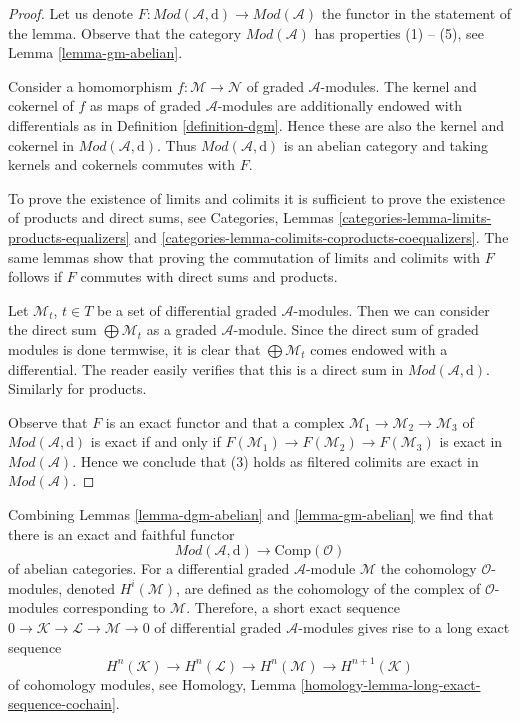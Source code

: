 \documentclass{stacks-project}
\theoremstyle{plain}
\theoremstyle{definition}
\theoremstyle{remark}
\numberwithin{equation}{subsection}
\begin{document}
\begin{proof}
Let us denote
$F : \textit{Mod}(\mathcal{A}, \text{d}) \to \textit{Mod}(\mathcal{A})$
the functor in the statement of the lemma. Observe that
the category $\textit{Mod}(\mathcal{A})$ has properties (1) -- (5), see
Lemma \ref{lemma-gm-abelian}.

\medskip\noindent
Consider a homomorphism $f : \mathcal{M} \to \mathcal{N}$
of graded $\mathcal{A}$-modules. The kernel
and cokernel of $f$ as maps of graded $\mathcal{A}$-modules
are additionally endowed with differentials as in
Definition \ref{definition-dgm}. Hence these are also
the kernel and cokernel in $\textit{Mod}(\mathcal{A}, \text{d})$.
Thus $\textit{Mod}(\mathcal{A}, \text{d})$ is an abelian category
and taking kernels and cokernels commutes with $F$.

\medskip\noindent
To prove the existence of limits and colimits it is sufficient
to prove the existence of products and direct sums, see
Categories, Lemmas \ref{categories-lemma-limits-products-equalizers} and
\ref{categories-lemma-colimits-coproducts-coequalizers}.
The same lemmas show that
proving the commutation of limits and colimits with $F$
follows if $F$ commutes with direct sums and products.

\medskip\noindent
Let $\mathcal{M}_t$, $t \in T$ be a set of differential
graded $\mathcal{A}$-modules. Then we can consider the direct
sum $\bigoplus \mathcal{M}_t$ as a graded $\mathcal{A}$-module.
Since the direct sum of graded modules is done termwise, it is
clear that $\bigoplus \mathcal{M}_t$ comes endowed with a differential.
The reader easily verifies that this is a direct sum in
$\textit{Mod}(\mathcal{A}, \text{d})$. Similarly for products.

\medskip\noindent
Observe that $F$ is an exact functor and that
a complex $\mathcal{M}_1 \to \mathcal{M}_2 \to \mathcal{M}_3$
of $\textit{Mod}(\mathcal{A}, \text{d})$ is exact if and only if
$F(\mathcal{M}_1) \to F(\mathcal{M}_2) \to F(\mathcal{M}_3)$
is exact in $\textit{Mod}(\mathcal{A})$. Hence we conclude that (3)
holds as filtered colimits are exact in
$\textit{Mod}(\mathcal{A})$.
\end{proof}

\noindent
Combining Lemmas \ref{lemma-dgm-abelian} and \ref{lemma-gm-abelian}
we find that there is an exact and faithful functor
$$
\textit{Mod}(\mathcal{A}, \text{d}) \longrightarrow \text{Comp}(\mathcal{O})
$$
of abelian categories. For a differential graded $\mathcal{A}$-module
$\mathcal{M}$ the cohomology $\mathcal{O}$-modules, denoted $H^i(\mathcal{M})$,
are defined as the cohomology of the complex of
$\mathcal{O}$-modules corresponding to $\mathcal{M}$.
Therefore, a short exact sequence 
$0 \to \mathcal{K} \to \mathcal{L} \to \mathcal{M} \to 0$
of differential graded $\mathcal{A}$-modules
gives rise to a long exact sequence
\begin{equation}
\label{equation-les}
H^n(\mathcal{K}) \to H^n(\mathcal{L}) \to H^n(\mathcal{M}) \to
H^{n + 1}(\mathcal{K})
\end{equation}
of cohomology modules, see
Homology, Lemma \ref{homology-lemma-long-exact-sequence-cochain}.
\end{document}
